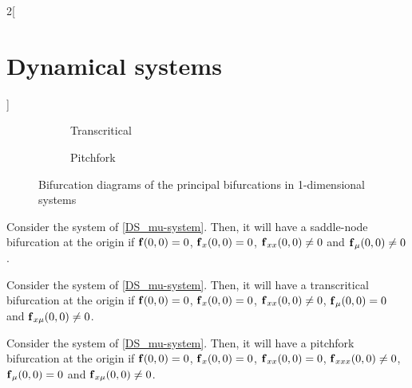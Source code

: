 \documentclass[../../../main_math.tex]{subfiles}
\begin{document}
\begin{multicols}{2}[\section{Dynamical systems}]
\begin{figure}[H]
\begin{subfigure}[b]{0.32\linewidth}
      \label{DS_sn}
    \end{subfigure}
    \hfill
    \begin{subfigure}[b]{0.32\linewidth}
      \centering
      
      \caption{Transcritical}
      \label{DS_trans}
    \end{subfigure}
    \hfill
    \begin{subfigure}[b]{0.32\linewidth}
      \centering
      
      \caption{Pitchfork}
      \label{DS_fork}
    \end{subfigure}
    \caption{Bifurcation diagrams of the principal bifurcations in 1-dimensional systems}
  \end{figure}
  \begin{theorem}
    Consider the system of \cref{DS_mu-system}. Then, it will have a saddle-node bifurcation at the origin if $\boldsymbol{\mathrm{f}}(0,0)=0$, $\boldsymbol{\mathrm{f}}_x(0,0)=0$, $\boldsymbol{\mathrm{f}}_{xx}(0,0)\ne 0$ and $\boldsymbol{\mathrm{f}}_\mu(0,0)\ne0$.
  \end{theorem}
  \begin{theorem}
    Consider the system of \cref{DS_mu-system}. Then, it will have a transcritical bifurcation at the origin if $\boldsymbol{\mathrm{f}}(0,0)=0$, $\boldsymbol{\mathrm{f}}_x(0,0)=0$, $\boldsymbol{\mathrm{f}}_{xx}(0,0)\ne 0$, $\boldsymbol{\mathrm{f}}_\mu(0,0)=0$ and $\boldsymbol{\mathrm{f}}_{x\mu}(0,0)\ne 0$.
  \end{theorem}
  \begin{theorem}
    Consider the system of \cref{DS_mu-system}. Then, it will have a pitchfork bifurcation at the origin if $\boldsymbol{\mathrm{f}}(0,0)=0$, $\boldsymbol{\mathrm{f}}_x(0,0)=0$, $\boldsymbol{\mathrm{f}}_{xx}(0,0)=0$, $\boldsymbol{\mathrm{f}}_{xxx}(0,0)\ne 0$, $\boldsymbol{\mathrm{f}}_\mu(0,0)=0$ and $\boldsymbol{\mathrm{f}}_{x\mu}(0,0)\ne 0$.
  \end{theorem}

\end{multicols}
\end{document}
